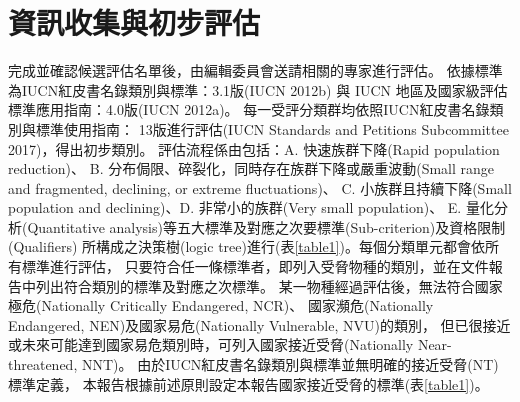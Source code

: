 \section{資訊收集與初步評估}
\begin{multicols}{2}

完成並確認候選評估名單後，由編輯委員會送請相關的專家進行評估。
依據標準為IUCN紅皮書名錄類別與標準：3.1版(IUCN 2012b) 與 IUCN
地區及國家級評估標準應用指南：4.0版(IUCN 2012a)。
每一受評分類群均依照IUCN紅皮書名錄類別與標準使用指南：
13版進行評估(IUCN Standards and Petitions Subcommittee 2017)，得出初步類別。
評估流程係由包括：A. 快速族群下降(Rapid population reduction)、
B. 分布侷限、碎裂化，同時存在族群下降或嚴重波動(Small range and fragmented, declining, or extreme fluctuations)、
C. 小族群且持續下降(Small population and declining)、D. 非常小的族群(Very small population)、
E. 量化分析(Quantitative analysis)等五大標準及對應之次要標準(Sub-criterion)及資格限制(Qualifiers)
所構成之決策樹(logic tree)進行(表\ref{table1})。每個分類單元都會依所有標準進行評估，
只要符合任一條標準者，即列入受脅物種的類別，並在文件報告中列出符合類別的標準及對應之次標準。
某一物種經過評估後，無法符合國家極危(Nationally Critically Endangered, NCR)、
國家瀕危(Nationally Endangered, NEN)及國家易危(Nationally Vulnerable, NVU)的類別，
但已很接近或未來可能達到國家易危類別時，可列入國家接近受脅(Nationally Near-threatened, NNT)。
由於IUCN紅皮書名錄類別與標準並無明確的接近受脅(NT)標準定義，
本報告根據前述原則設定本報告國家接近受脅的標準(表\ref{table1})。\\
\end{multicols}
